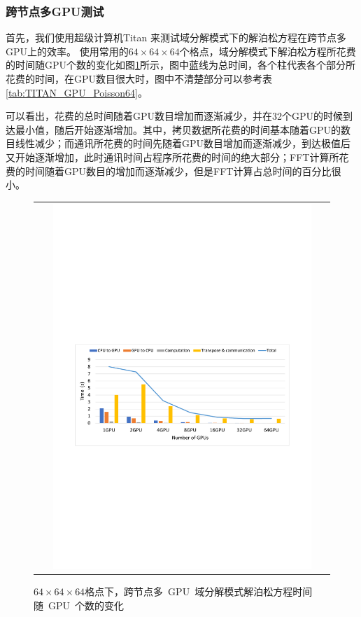 \subsubsection{跨节点多GPU测试}
首先，我们使用超级计算机Titan 来测试域分解模式下的解泊松方程在跨节点多GPU上的效率。
使用常用的$64 \times 64 \times 64$个格点，域分解模式下解泊松方程所花费的时间随GPU个数的变化如图\ref{fig:TITAN_GPU_Poisson64}所示，图中蓝线为总时间，各个柱代表各个部分所花费的时间，在GPU数目很大时，图中不清楚部分可以参考表\ref{tab:TITAN_GPU_Poisson64}。

可以看出，花费的总时间随着GPU数目增加而逐渐减少，并在32个GPU的时候到达最小值，随后开始逐渐增加。其中，拷贝数据所花费的时间基本随着GPU的数目线性减少；而通讯所花费的时间先随着GPU数目增加而逐渐减少，到达极值后又开始逐渐增加，此时通讯时间占程序所花费的时间的绝大部分；FFT计算所花费的时间随着GPU数目的增加而逐渐减少，但是FFT计算占总时间的百分比很小。

\begin{figure}[!htb]
  \centering
  \begin{tabular}{|l|l|}
    \multicolumn{2}{c}{
    \includegraphics[width=0.9\textwidth]{Img/domain_decomposition_Titan64.pdf}} \\
  \end{tabular}
  \caption{$64 \times 64 \times 64$格点下，跨节点多~GPU~域分解模式解泊松方程时间随~GPU~个数的变化}
  \label{fig:TITAN_GPU_Poisson64}
\end{figure}

